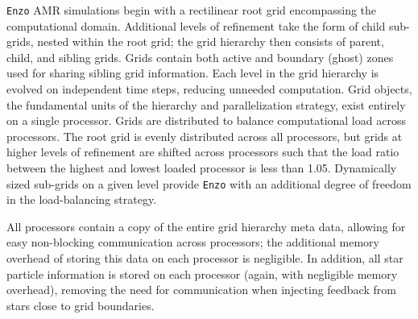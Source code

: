 \documentclass[11pt]{article}
\begin{document}
\texttt{Enzo} AMR simulations begin with a rectilinear root grid encompassing the computational domain. Additional levels of refinement take the form of child sub-grids, nested within the root grid; the grid hierarchy then consists of parent, child, and sibling grids. Grids contain both active and boundary (ghost) zones used for sharing sibling grid information. Each level in the grid hierarchy is evolved on independent time steps, reducing unneeded computation. 
Grid objects, the fundamental units of the hierarchy and parallelization strategy, exist entirely on a single processor. Grids are distributed to balance computational load across processors. The root grid is evenly distributed across all processors, but grids at higher levels of refinement are shifted across processors such that the load ratio between the highest and lowest loaded processor is less than 1.05. Dynamically sized sub-grids on a given level provide \texttt{Enzo} with an additional degree of freedom in the load-balancing strategy.

All processors contain a copy of the entire grid hierarchy meta data, allowing for easy non-blocking communication across processors; the additional memory overhead of storing this data on each processor is negligible. In addition, all star particle information is stored on each processor (again, with negligible memory overhead), removing the need for communication when injecting feedback from stars close to grid boundaries.
\end{document}
